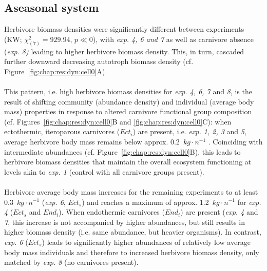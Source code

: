 \subsection{Aseasonal system}
\label{chap:res:popind:cell0}
Herbivore biomass densities were significantly different between experiments  (KW; $\chi^{2}_{(7)} = 929.94$, $p \ll 0$), with \textit{exp. 4, 6 and 7} as well as carnivore absence (\textit{exp. 8)} leading to higher herbivore biomass density. 
This, in turn, cascaded further downward decreasing autotroph biomass density (cf. Figure~\ref{fig:chap:res:dyn:cell0}A).
\\\\
This pattern, i.e. high herbivore biomass densities for \textit{exp. 4, 6, 7} and \textit{8}, is the result of shifting community (abundance density) and individual (average body mass) properties in response to altered carnivore functional group composition (cf. Figures~\ref{fig:chap:res:dyn:cell0}B and \ref{fig:chap:res:dyn:cell0}C): when ectothermic, iteroparous carnivores ($Ect_i$) are present, i.e. \textit{exp. 1, 2, 3} and \textit{5}, average herbivore body mass remains below approx. 0.2~$kg\cdot n^{-1}$ . 
Coinciding with intermediate abundances (cf. Figure~\ref{fig:chap:res:dyn:cell0}B), 
this leads to herbivore biomass densities that maintain the overall ecosystem functioning at levels akin to \textit{exp. 1} (control with all carnivore groups present).\\\\
Herbivore average body mass increases for the remaining experiments to at least 0.3~$kg\cdot n^{-1}$ (\textit{exp. 6}, $Ect_s$) and reaches a maximum of approx. 1.2~$kg\cdot n^{-1}$ for \textit{exp. 4}  ($Ect_s$ and $End_i$). 
When endothermic carnivores ($End_i$) are present (\textit{exp. 4} and \textit{7}, this increase is not accompanied by higher abundances, but still results in higher biomass density (i.e. same abundance, but heavier organisms). 
In contrast, \textit{exp. 6} ($Ect_s$) leads to significantly higher abundances of relatively low average body mass individuals and therefore to increased herbivore biomass density, only matched by \textit{exp. 8} (no carnivores present).

